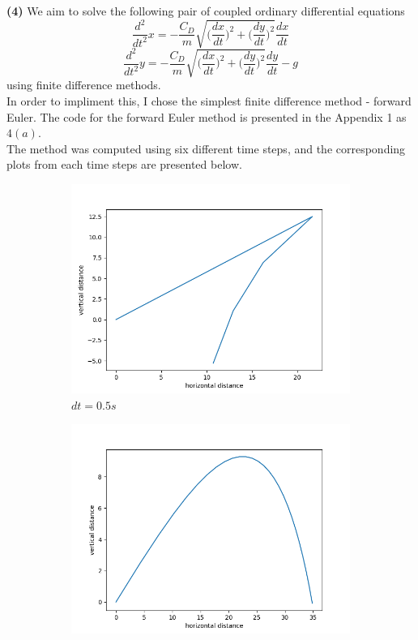 \documentclass[12pt]{article}
\begin{document}
\noindent \textbf{(4)} We aim to solve the following pair of coupled ordinary differential equations $$\frac{d^2}{dt^2}x = - \frac{C_D}{m}\sqrt{\bigg (\frac{dx}{dt} \bigg )^2 + \bigg (\frac{dy}{dt} \bigg )^2}\frac{dx}{dt}$$ $$\frac{d^2}{dt^2}y = - \frac{C_D}{m}\sqrt{\bigg (\frac{dx}{dt}\bigg )^2 + \bigg (\frac{dy}{dt}\bigg )^2}\frac{dy}{dt} - g$$ using finite difference methods. \\
In order to impliment this, I chose the simplest finite difference method - forward Euler. The code for the forward Euler method is presented in the Appendix 1 as $4(a)$.\\
The method was computed using six different time steps, and the corresponding plots from each time steps are presented below. 
\begin{figure}[h]
	\centering
	\begin{subfigure}[h]{0.30\textwidth}
		\centering
		\includegraphics[width=\textwidth]{dtp5.png}
		\caption{$dt = 0.5s$ }
	\end{subfigure}
	\begin{subfigure}[h]{0.300\textwidth}
		\centering
		\includegraphics[width=\textwidth]{dtp1.png}

\end{subfigure}
\end{figure}
\end{document}
